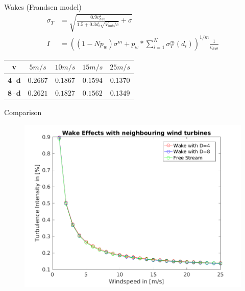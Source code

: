 \documentclass[12pt,t]{beamer}
\begin{document}
\begin{frame}
\normalsize
Wakes (Frandsen model)
\begin{align*}
 \sigma_T &= \sqrt{\frac{0.9 v_{hub}^2}{1.5+0.3 d_i \sqrt{V_{hub}/c}}+\sigma} \\
     I &= {((1-Np_w)\sigma^m+p_w*\sum_{i=1}^{N}\sigma_T^m(d_i))}^{1/m} \frac{1}{v_{hub}}
\end{align*}
\begin{table}[H]
\centering
\begin{tabular}{| c | c | c | c | c |}
\hline
\textbf{v} & $5m/s$ & $10m/s$ & $15m/s$ & $25m/s$ \\
\hline
$\mathbf{4 \cdot d}$ & $0.2667$ & $0.1867$ & $0.1594$ & $ 0.1370$	\\
\hline
$\mathbf{8 \cdot d}$ & $0.2621$ & $0.1827$ & $0.1562$ & $0.1349$	\\
\hline
\end{tabular}
\end{table}
\end{frame}

\begin{frame}
\huge
Comparison
\begin{figure}[H]
\centering
\includegraphics[width=0.9\linewidth]{../CIP_5/CIP_Tutorial_5_-_Windfield_and_wake_simulation/wake_effects_5.png}
\end{figure} 
\end{frame}
\end{document}
